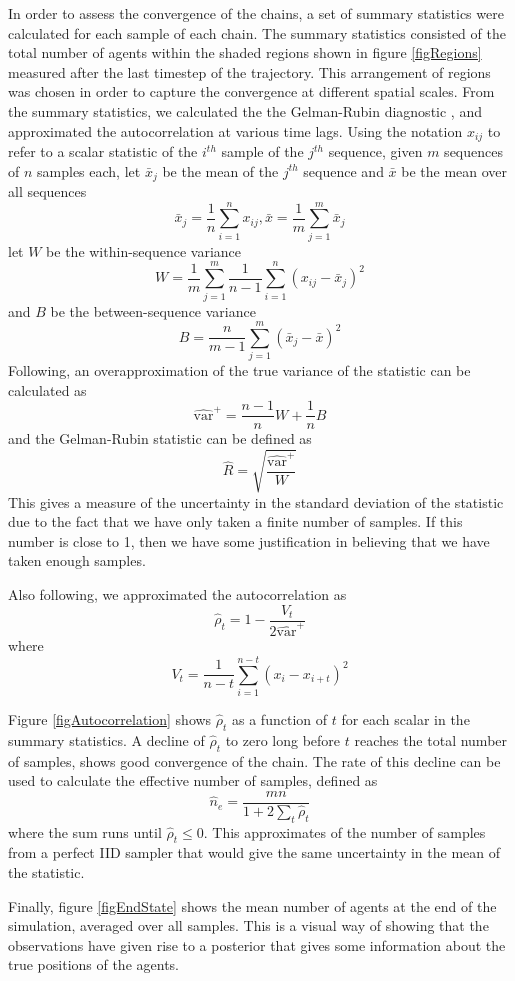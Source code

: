 \documentclass{article}
\begin{document}
In order to assess the convergence of the chains, a set of summary statistics were calculated for each sample of each chain. The summary statistics consisted of the total number of agents within the shaded regions shown in figure \ref{figRegions} measured after the last timestep of the trajectory. This arrangement of regions was chosen in order to capture the convergence at different spatial scales. From the summary statistics, we calculated the the Gelman-Rubin diagnostic \cite{gelman1992inference}, and approximated the autocorrelation at various time lags. Using the notation $x_{ij}$ to refer to a scalar statistic of the $i^{th}$ sample of the $j^{th}$ sequence, given $m$ sequences of $n$ samples each, let $\bar{x}_j$ be the mean of the $j^{th}$ sequence and $\bar{x}$ be the mean over all sequences
\[
\bar{x}_j = \frac{1}{n}\sum_{i=1}^n x_{ij}, \bar{x} = \frac{1}{m}\sum_{j=1}^m \bar{x}_j
\]
let $W$ be the within-sequence variance
\[
W = \frac{1}{m} \sum_{j=1}^m \frac{1}{n-1} \sum_{i=1}^n (x_{ij} - \bar{x}_j)^2
\]
and $B$ be the between-sequence variance
\[
B = \frac{n}{m-1}\sum_{j=1}^m (\bar{x}_j - \bar{x})^2
\]
Following\cite{gelman2013bayesian}, an overapproximation of the true variance of the statistic can be calculated as
\[
\widehat{\text{var}}^+ = \frac{n-1}{n}W + \frac{1}{n}B
\]
and the Gelman-Rubin statistic can be defined as
\[
\hat{R} = \sqrt{\frac{\widehat{\text{var}}^+}{W}}
\]
This gives a measure of the uncertainty in the standard deviation of the statistic due to the fact that we have only taken a finite number of samples. If this number is close to 1, then we have some justification in believing that we have taken enough samples.

Also following\cite{gelman2013bayesian}, we approximated the autocorrelation as
\[
\hat{\rho}_t = 1 - \frac{V_t}{2\widehat{\text{var}}^+}
\]
where
\[
V_t = \frac{1}{n-t} \sum_{i=1}^{n-t} (x_i - x_{i+t})^2
\]

Figure \ref{figAutocorrelation} shows $\hat{\rho}_t$ as a function of $t$ for each scalar in the summary statistics. A decline of $\hat{\rho}_t$ to zero long before $t$ reaches the total number of samples, shows good convergence of the chain. The rate of this decline can be used to calculate the effective number of samples, defined as
\[
\hat{n}_e = \frac{mn}{1 + 2\sum_{t} \hat{\rho}_t}
\]
where the sum runs until $\hat{\rho}_t \le 0$. This approximates of the number of samples from a perfect IID sampler that would give the same uncertainty in the mean of the statistic.

Finally, figure \ref{figEndState} shows the mean number of agents at the end of the simulation, averaged over all samples. This is a visual way of showing that the observations have given rise to a posterior that gives some information about the true positions of the agents.
 
\end{document}
